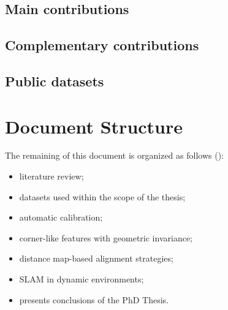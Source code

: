 \subsection{Main contributions}
\begin{description}[leftmargin=1cm,style=nextline,font=\normalfont]
\item[\cite{sousa:jfr:2023}] 
\item[\cite{sousa:icara:2024}] 
\item[\cite{sousa:icarsc:2025}] 
\end{description}
\subsection{Complementary contributions}
\begin{description}[leftmargin=1cm,style=nextline,font=\normalfont]
\item[\cite{ribeiro:access:2025}] 
\item[\cite{lopes:icara:2026}] 
\end{description}
\subsection{Public datasets}
\begin{description}[leftmargin=1cm,style=nextline,font=\normalfont]
\item[\cite{ribeiro:dataset:2025}] 
\end{description}

\section{Document Structure}\label{sec:intro:structure}

The remaining of this document is organized as follows ():
\begin{itemize}
\item {} literature review;
\item {} datasets used within the scope of the thesis;
\item {} automatic calibration;
\item {} corner-like features with geometric invariance;
\item {} distance map-based alignment strategies;
\item {} SLAM in dynamic environments;
\item {} presents conclusions of the PhD Thesis.
\end{itemize}

